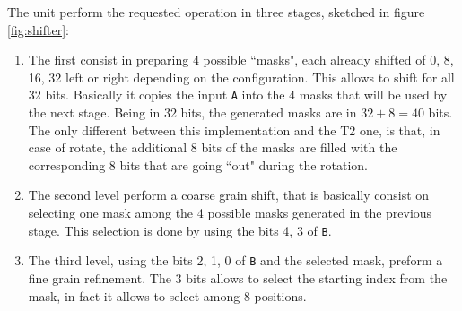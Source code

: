  The unit perform the requested operation in three stages, sketched in figure \ref{fig:shifter}:
\begin{enumerate}
	\item The first consist in preparing 4 possible ``masks", each already shifted of {0, 8, 16, 32} left
	or right depending on the configuration. This allows to shift for all 32 bits. Basically it copies
	the input \texttt{A} into the 4 masks that will be used by the next stage. Being in 32 bits, the generated masks are in $32+8=40$ bits. The only different between this implementation and the T2 one, is that, in case of rotate, the additional 8 bits of the masks are filled with the corresponding 8 bits that are going ``out" during the rotation.
	
	\item The second level perform a coarse grain shift, that is basically consist on selecting one mask
	among the 4 possible masks generated in the previous stage. This selection is done by using the bits {4, 3} of \texttt{B}.
	\item The third level, using the bits {2, 1, 0} of \texttt{B} and the selected mask, preform a fine grain refinement. The 3 bits allows to select the starting index from the mask, in fact it allows to select among 8 positions.
\end{enumerate}



